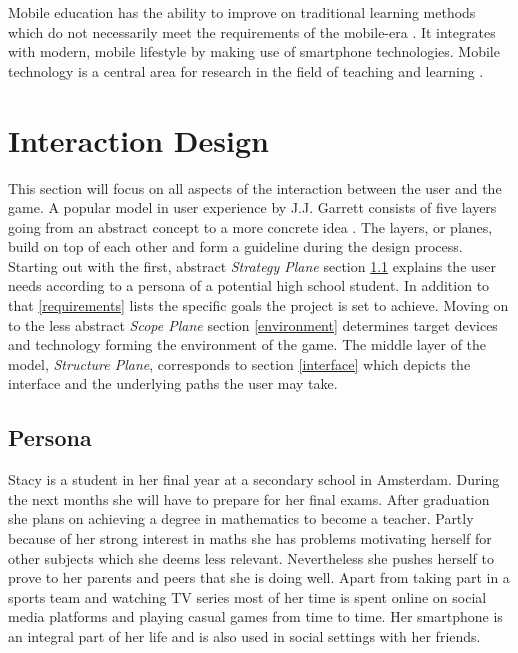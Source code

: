 Mobile education has the ability to improve on traditional learning methods which do not necessarily meet the requirements of the mobile-era \cite{Sciences2015MobileScenario}. It integrates with modern, mobile lifestyle by making use of smartphone technologies. Mobile technology is a central area for research in the field of teaching and learning \cite{Ally2014WhatEducation}.


\section{Interaction Design}
This section will focus on all aspects of the interaction between the user and the game.
A popular model in user experience by J.J. Garrett consists of five layers going from an abstract concept to a more concrete idea \cite{Garrett2000InterfaceObjectives}.
The layers, or planes, build on top of each other and form a guideline during the design process.
Starting out with the first, abstract \textit{Strategy Plane} section \ref{persona} explains the user needs according to a persona of a potential high school student. In addition to that \ref{requirements} lists the specific goals the project is set to achieve.
Moving on to the less abstract \textit{Scope Plane} section \ref{environment} determines target devices and technology forming the environment of the game.
The middle layer of the model, \textit{Structure Plane}, corresponds to section \ref{interface} which depicts the interface and the underlying paths the user may take.

\subsection{Persona} \label{persona}
Stacy is a student in her final year at a secondary school in Amsterdam. During the next months she will have to prepare for her final exams. After graduation she plans on achieving a degree in mathematics to become a teacher. Partly because of her strong interest in maths she has problems motivating herself for other subjects which she deems less relevant. Nevertheless she pushes herself to prove to her parents and peers that she is doing well. Apart from taking part in a sports team and watching TV series most of her time is spent online on social media platforms and playing casual games from time to time. Her smartphone is an integral part of her life and is also used in social settings with her friends.

